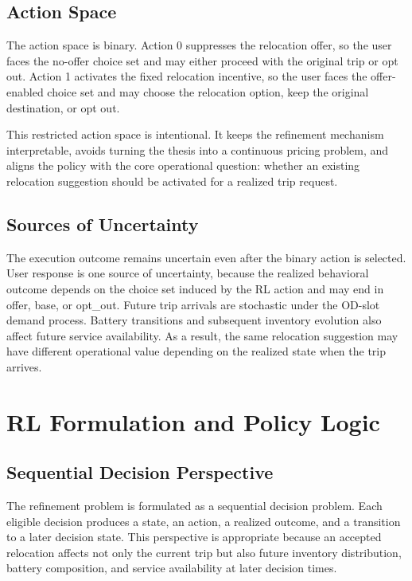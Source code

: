 \subsection{Action Space}

The action space is binary. Action 0 suppresses the relocation offer, so the user faces the no-offer choice set and may either proceed with the original trip or opt out. Action 1 activates the fixed relocation incentive, so the user faces the offer-enabled choice set and may choose the relocation option, keep the original destination, or opt out.

This restricted action space is intentional. It keeps the refinement mechanism interpretable, avoids turning the thesis into a continuous pricing problem, and aligns the policy with the core operational question: whether an existing relocation suggestion should be activated for a realized trip request.


\subsection{Sources of Uncertainty}

The execution outcome remains uncertain even after the binary action is selected. User response is one source of uncertainty, because the realized behavioral outcome depends on the choice set induced by the RL action and may end in offer, base, or opt\_out. Future trip arrivals are stochastic under the OD-slot demand process. Battery transitions and subsequent inventory evolution also affect future service availability. As a result, the same relocation suggestion may have different operational value depending on the realized state when the trip arrives.

\section{RL Formulation and Policy Logic}

\subsection{Sequential Decision Perspective}

The refinement problem is formulated as a sequential decision problem. Each eligible decision produces a state, an action, a realized outcome, and a transition to a later decision state. This perspective is appropriate because an accepted relocation affects not only the current trip but also future inventory distribution, battery composition, and service availability at later decision times.

